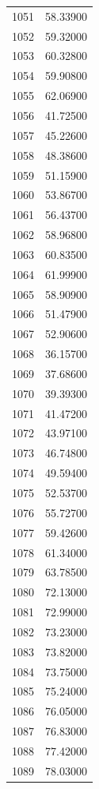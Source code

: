 \documentclass[
  letterpaper,
  DIV=11,
  numbers=noendperiod]{scrreprt}
\begin{document}
\begin{tcolorbox}
\begin{tabular}{lr}
1051 &         58.33900 \\
1052 &         59.32000 \\
1053 &         60.32800 \\
1054 &         59.90800 \\
1055 &         62.06900 \\
1056 &         41.72500 \\
1057 &         45.22600 \\
1058 &         48.38600 \\
1059 &         51.15900 \\
1060 &         53.86700 \\
1061 &         56.43700 \\
1062 &         58.96800 \\
1063 &         60.83500 \\
1064 &         61.99900 \\
1065 &         58.90900 \\
1066 &         51.47900 \\
1067 &         52.90600 \\
1068 &         36.15700 \\
1069 &         37.68600 \\
1070 &         39.39300 \\
1071 &         41.47200 \\
1072 &         43.97100 \\
1073 &         46.74800 \\
1074 &         49.59400 \\
1075 &         52.53700 \\
1076 &         55.72700 \\
1077 &         59.42600 \\
1078 &         61.34000 \\
1079 &         63.78500 \\
1080 &         72.13000 \\
1081 &         72.99000 \\
1082 &         73.23000 \\
1083 &         73.82000 \\
1084 &         73.75000 \\
1085 &         75.24000 \\
1086 &         76.05000 \\
1087 &         76.83000 \\
1088 &         77.42000 \\
1089 &         78.03000 \\

\end{tabular}
\end{tcolorbox}
\end{document}
